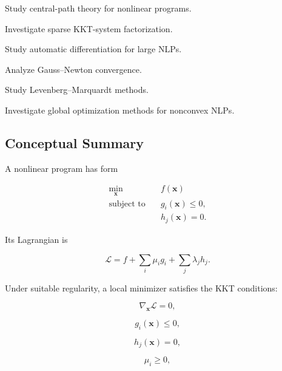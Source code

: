 \begin{exercise}[4]
Study central-path theory for nonlinear programs.
\end{exercise}

\begin{exercise}[4]
Investigate sparse KKT-system factorization.
\end{exercise}

\begin{exercise}[4]
Study automatic differentiation for large NLPs.
\end{exercise}

\begin{exercise}[4]
Analyze Gauss--Newton convergence.
\end{exercise}

\begin{exercise}[4]
Study Levenberg--Marquardt methods.
\end{exercise}

\begin{exercise}[4]
Investigate global optimization methods for nonconvex NLPs.
\end{exercise}

\subsection{Conceptual Summary}
\label{subsec:nonlinear-programming-summary}

A nonlinear program has form

\[
\boxed{
\begin{aligned}
\min_{\mathbf{x}}
\quad&
f(\mathbf{x})
\\
\text{subject to}
\quad&
g_i(\mathbf{x})\leq0,
\\
&
h_j(\mathbf{x})=0.
\end{aligned}
}
\]

Its Lagrangian is

\[
\boxed{
\mathcal{L}
=
f
+
\sum_i
\mu_i g_i
+
\sum_j
\lambda_jh_j.
}
\]

Under suitable regularity, a local minimizer satisfies the KKT
conditions:

\[
\boxed{
\nabla_{\mathbf{x}}\mathcal{L}=0,
}
\]

\[
\boxed{
g_i(\mathbf{x})\leq0,
}
\]

\[
\boxed{
h_j(\mathbf{x})=0,
}
\]

\[
\boxed{
\mu_i\geq0,
}
\]

